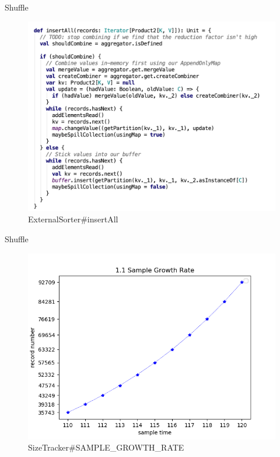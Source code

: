 \begin{frame}[plain,t]{Shuffle} %
	 \\  \vspace{2ex}
	\begin{figure}
		\centering
		\includegraphics[width=0.8\linewidth]{images/shufflewriter002}
		\caption{ExternalSorter\#insertAll}
		\label{fig:shufflewriter002}
	\end{figure}
		
\end{frame}
\begin{frame}[plain,t]{Shuffle} %
	 \\  \vspace{2ex}
	\begin{figure}
		\centering
		\includegraphics[width=0.7\linewidth]{images/s001}
		\caption{SizeTracker\#SAMPLE\_GROWTH\_RATE}
		\label{fig:s001}
	\end{figure}
	
\end{frame}
